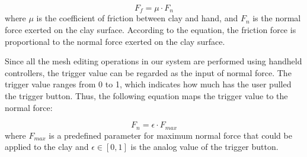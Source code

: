 \documentclass{svjour3}                     %
\begin{document}
\begin{equation}
F_{f} = \mu \cdot F_{n}
\end{equation}
where $\mu$ is the coefficient of friction between clay and hand, and $F_{n}$ is the normal force exerted on the clay surface. According to the equation, the friction force is proportional to the normal force exerted on the clay surface.
{\color{blue}
Since all the mesh editing operations in our system are performed using handheld controllers, the trigger value can be regarded as the input of normal force.
The trigger value ranges from 0 to 1, which indicates how much has the user pulled the trigger button.
Thus, the following equation maps the trigger value to the normal force:

\begin{equation}
F_{n} = \epsilon \cdot F_{max}
\end{equation}
where $F_{max}$ is a predefined parameter for maximum normal force that could be applied to the clay and $\epsilon \in [0,1]$ is the analog value of the trigger button.}
\end{document}
